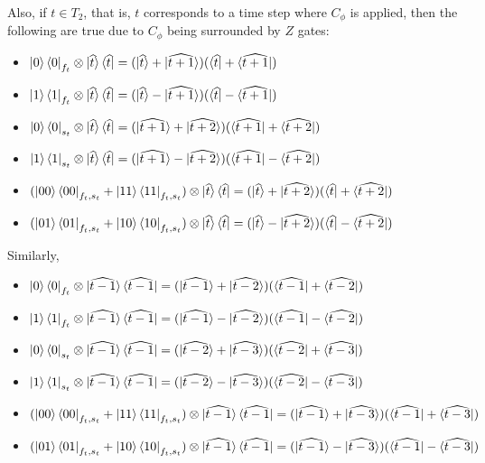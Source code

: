 Also, if $t\in T_2$, that is, $t$ corresponds to a time step where $C_\phi$ is applied, then the following are true due to $C_\phi$ being surrounded by $Z$ gates:
\begin{itemize}
	\item $\ket{0}\bra{0}_{f_t}\otimes
		\ket{\widehat{t}}\bra{\widehat{t}}
		=(\ket{\widehat{t}}+\ket{\widehat{t+1}})
		(\bra{\widehat{t}}+\bra{\widehat{t+1}})$
	\item $\ket{1}\bra{1}_{f_t}\otimes
		\ket{\widehat{t}}\bra{\widehat{t}}
		=(\ket{\widehat{t}}-\ket{\widehat{t+1}})
		(\bra{\widehat{t}}-\bra{\widehat{t+1}})$
	\item $\ket{0}\bra{0}_{s_t}\otimes
		\ket{\widehat{t}}\bra{\widehat{t}}
		=(\ket{\widehat{t+1}}+\ket{\widehat{t+2}})
		(\bra{\widehat{t+1}}+\bra{\widehat{t+2}})$
	\item $\ket{1}\bra{1}_{s_t}\otimes
		\ket{\widehat{t}}\bra{\widehat{t}}
		=(\ket{\widehat{t+1}}-\ket{\widehat{t+2}})
		(\bra{\widehat{t+1}}-\bra{\widehat{t+2}})$
	\item $(\ket{00}\bra{00}_{f_t,s_t}
		+\ket{11}\bra{11}_{f_t,s_t})\otimes
		\ket{\widehat{t}}\bra{\widehat{t}}
		=(\ket{\widehat{t}}+\ket{\widehat{t+2}})
		(\bra{\widehat{t}}+\bra{\widehat{t+2}})$
	\item $(\ket{01}\bra{01}_{f_t,s_t}
		+\ket{10}\bra{10}_{f_t,s_t})\otimes
		\ket{\widehat{t}}\bra{\widehat{t}}
		=(\ket{\widehat{t}}-\ket{\widehat{t+2}})
		(\bra{\widehat{t}}-\bra{\widehat{t+2}})$
\end{itemize}

Similarly,
\begin{itemize}
	\item $\ket{0}\bra{0}_{f_t}\otimes
		\ket{\widehat{t-1}}\bra{\widehat{t-1}}
		=(\ket{\widehat{t-1}}+\ket{\widehat{t-2}})
		(\bra{\widehat{t-1}}+\bra{\widehat{t-2}})$
	\item $\ket{1}\bra{1}_{f_t}\otimes
		\ket{\widehat{t-1}}\bra{\widehat{t-1}}
		=(\ket{\widehat{t-1}}-\ket{\widehat{t-2}})
		(\bra{\widehat{t-1}}-\bra{\widehat{t-2}})$
	\item $\ket{0}\bra{0}_{s_t}\otimes
		\ket{\widehat{t-1}}\bra{\widehat{t-1}}
		=(\ket{\widehat{t-2}}+\ket{\widehat{t-3}})
		(\bra{\widehat{t-2}}+\bra{\widehat{t-3}})$
	\item $\ket{1}\bra{1}_{s_t}\otimes
		\ket{\widehat{t-1}}\bra{\widehat{t-1}}
		=(\ket{\widehat{t-2}}-\ket{\widehat{t-3}})
		(\bra{\widehat{t-2}}-\bra{\widehat{t-3}})$
	\item $(\ket{00}\bra{00}_{f_t,s_t}
		+\ket{11}\bra{11}_{f_t,s_t})\otimes
		\ket{\widehat{t-1}}\bra{\widehat{t-1}}
		=(\ket{\widehat{t-1}}+\ket{\widehat{t-3}})
		(\bra{\widehat{t-1}}+\bra{\widehat{t-3}})$
	\item $(\ket{01}\bra{01}_{f_t,s_t}
		+\ket{10}\bra{10}_{f_t,s_t})\otimes
		\ket{\widehat{t-1}}\bra{\widehat{t-1}}
		=(\ket{\widehat{t-1}}-\ket{\widehat{t-3}})
		(\bra{\widehat{t-1}}-\bra{\widehat{t-3}})$
\end{itemize}

